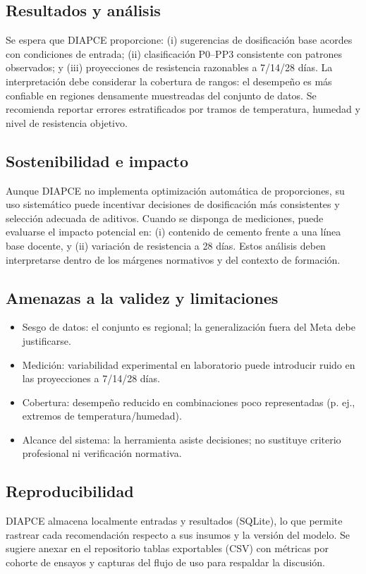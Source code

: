 \documentclass[12pt, letterpaper]{article}
\begin{document}
\subsection{Resultados y análisis}
Se espera que DIAPCE proporcione: (i) sugerencias de dosificación base acordes con condiciones de entrada; (ii) clasificación P0–PP3 consistente con patrones observados; y (iii) proyecciones de resistencia razonables a 7/14/28 días. La interpretación debe considerar la cobertura de rangos: el desempeño es más confiable en regiones densamente muestreadas del conjunto de datos. Se recomienda reportar errores estratificados por tramos de temperatura, humedad y nivel de resistencia objetivo.



\subsection{Sostenibilidad e impacto}
Aunque DIAPCE no implementa optimización automática de proporciones, su uso sistemático puede incentivar decisiones de dosificación más consistentes y selección adecuada de aditivos. Cuando se disponga de mediciones, puede evaluarse el impacto potencial en: (i) contenido de cemento frente a una línea base docente, y (ii) variación de resistencia a 28 días. Estos análisis deben interpretarse dentro de los márgenes normativos y del contexto de formación.

\subsection{Amenazas a la validez y limitaciones}
\begin{itemize}
  \item Sesgo de datos: el conjunto es regional; la generalización fuera del Meta debe justificarse.
  \item Medición: variabilidad experimental en laboratorio puede introducir ruido en las proyecciones a 7/14/28 días.
  \item Cobertura: desempeño reducido en combinaciones poco representadas (p. ej., extremos de temperatura/humedad).
  \item Alcance del sistema: la herramienta asiste decisiones; no sustituye criterio profesional ni verificación normativa.
\end{itemize}

\subsection{Reproducibilidad}
DIAPCE almacena localmente entradas y resultados (SQLite), lo que permite rastrear cada recomendación respecto a sus insumos y la versión del modelo. Se sugiere anexar en el repositorio tablas exportables (CSV) con métricas por cohorte de ensayos y capturas del flujo de uso para respaldar la discusión.
\end{document}
